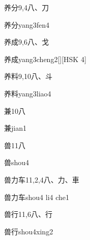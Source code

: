 \begin{entry}{养分}{9,4}{⼋、⼑}
  \begin{phonetics}{养分}{yang3fen4}
  \end{phonetics}
\end{entry}

\begin{entry}{养成}{9,6}{⼋、⼽}
  \begin{phonetics}{养成}{yang3cheng2}[][HSK 4]
  \end{phonetics}
\end{entry}

\begin{entry}{养料}{9,10}{⼋、⽃}
  \begin{phonetics}{养料}{yang3liao4}
  \end{phonetics}
\end{entry}

\begin{entry}{兼}{10}{⼋}
  \begin{phonetics}{兼}{jian1}
  \end{phonetics}
\end{entry}

\begin{entry}{兽}{11}{⼋}
  \begin{phonetics}{兽}{shou4}
  \end{phonetics}
\end{entry}

\begin{entry}{兽力车}{11,2,4}{⼋、⼒、⾞}
  \begin{phonetics}{兽力车}{shou4 li4 che1}
  \end{phonetics}
\end{entry}

\begin{entry}{兽行}{11,6}{⼋、⾏}
  \begin{phonetics}{兽行}{shou4xing2}
  \end{phonetics}
\end{entry}


